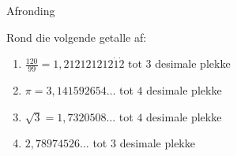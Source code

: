 \begin{wex}{Afronding}

{
\begin{minipage}{\textwidth}
Rond die volgende getalle af: 

\begin{enumerate}[itemsep=5pt, label=\textbf{\arabic*}. ] 

\item $\frac{120}{99}=1,212121212\dot{1}\dot{2}$ tot $3$ desimale plekke
\item $\pi =3,141592654\ldots$ tot $4$ desimale plekke
\item $\sqrt{3}=1,7320508\ldots$ tot $4$ desimale plekke
\item $2,78974526\ldots$ tot $3$ desimale plekke
\end{enumerate}
\end{minipage}
}
{


}
\end{wex}
